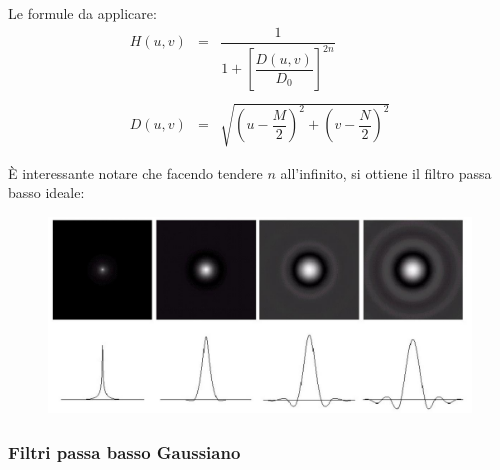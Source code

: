 \documentclass[a4paper]{article}
\begin{document}
	\noindent
	Le formule da applicare:
	\begin{equation*}
		\begin{array}{lll}
			H\left(u,v\right) & = & \dfrac{1}{1 + \left[\dfrac{D\left(u,v\right)}{D_{0}}\right]^{2n}} \\
			&& \\
			D\left(u,v\right) & = & \sqrt{\left(u - \dfrac{M}{2}\right)^{2} + \left(v - \dfrac{N}{2}\right)^{2}}
		\end{array}
	\end{equation*}
	
	\noindent
	È interessante notare che facendo tendere $n$ all'infinito, si ottiene il filtro passa basso ideale:
	\begin{figure}[!htp]
		\centering
		\includegraphics[width=\textwidth]{img/filtro_passa_basso_butterworth-ideale.png}
	\end{figure}\newpage

	\subsubsection{Filtri passa basso Gaussiano}
	
\end{document}
